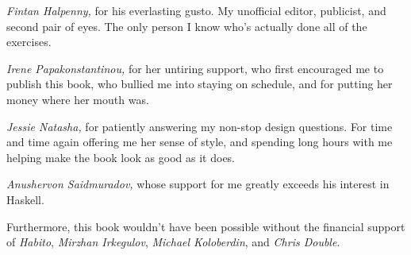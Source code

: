 \documentclass[book.tex]{subfiles}
\begin{document}
\emph{Fintan Halpenny,} for his everlasting gusto. My unofficial editor,
publicist, and second pair of eyes. The only person I know who's actually done
all of the exercises.

\emph{Irene Papakonstantinou,} for her untiring support, who first encouraged me
to publish this book, who bullied me into staying on schedule, and for putting
her money where her mouth was.

\emph{Jessie Natasha,} for patiently answering my non-stop design questions. For
time and time again offering me her sense of style, and spending long hours with
me helping make the book look as good as it does.

\emph{Anushervon Saidmuradov,} whose support for me greatly exceeds his interest
in Haskell.

Furthermore, this book wouldn't have been possible without the financial support
of \emph{Habito}, \emph{Mirzhan Irkegulov}, \emph{Michael Koloberdin},
and \emph{Chris Double}.
\end{document}
